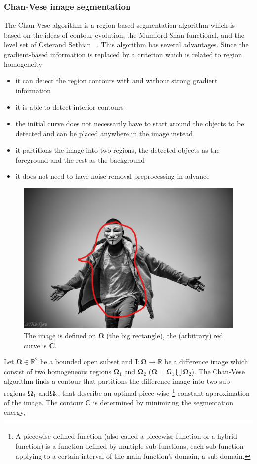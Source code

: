 \documentclass{WitsPhysicsReport}
\begin{document}
\subsubsection{Chan-Vese image segmentation}

The Chan-Vese algorithm is a region-based segmentation algorithm which is based on the ideas of contour evolution, the Mumford-Shan functional, and the level set of Osterand Sethian ~\cite{chan2001active,tai2006image,caselles1997geodesic}. This algorithm has several advantages. Since the gradient-based information is replaced  by  a criterion which is related to region homogeneity:
\begin{itemize}
    \item it  can  detect  the  region  contours  with  and  without strong gradient information
    \item it is able to detect interior contours
    \item  the  initial  curve  does  not  necessarily  have  to  start around  the  objects  to  be  detected  and  can  be  placed anywhere in the image instead
    \item it partitions the image into two regions, the detected objects as the foreground and the rest as the background
    \item it does not need to have noise removal preprocessing in advance
\end{itemize}

\begin{figure}[H]
\centering
  \includegraphics[width=0.5\linewidth]{Figure/me.jpg}
 \caption{The image is defined on $\mathbf{\Omega}$ (the big rectangle), the (arbitrary) red curve is $\mathbf{C}$.}
 \label{fig: cv_image}
\end{figure}





Let $\mathbf{\Omega} \in \mathbb{R}^{2}$ be a bounded open subset and $\mathbf{I}: \mathbf{\Omega} \rightarrow \mathbb{R}$ be a difference image which consist of two homogeneous regions $\mathbf{\Omega}_{1}$ and $\mathbf{\Omega}_{2}$ ($\mathbf{\Omega} = \mathbf{\Omega}_{1} \bigcup \mathbf{\Omega}_{2}$). The Chan-Vese algorithm finds a contour that partitions the difference image into two sub-regions $\mathbf{\Omega}_{1}$ and$\mathbf{\Omega}_{2}$, that describe an optimal piece-wise~\footnote{A piecewise-defined function (also called a piecewise function or a hybrid function) is a function defined by multiple sub-functions, each sub-function applying to a certain interval of the main function's domain, a sub-domain.} constant approximation of the image. The contour $\mathbf{C}$ is determined by minimizing the segmentation energy, ~\cite{chan2001active}
\end{document}
